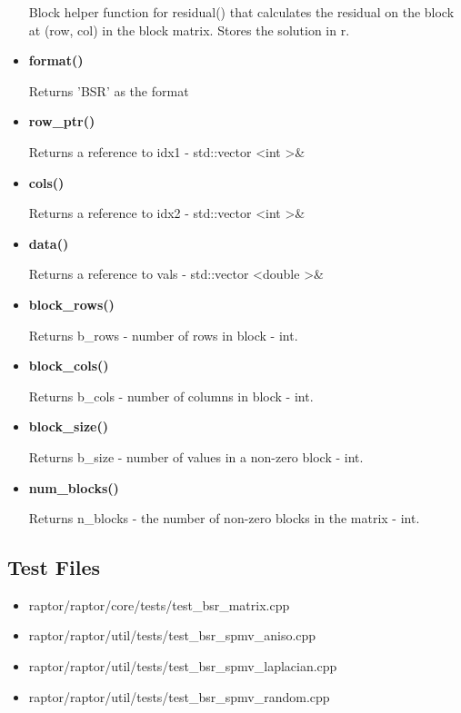 \documentclass{article}
\begin{document}
\begin{itemize}
            Block helper function for residual() that calculates the residual on the 
            block at (row, col) in the block matrix. Stores the solution in r.
                
        \item \textbf{format()}
        
            Returns 'BSR' as the format
        
        \item \textbf{row\_ptr()}
        
            Returns a reference to idx1 - std::vector \textless int \textgreater\&
        
        \item \textbf{cols()}
        
            Returns a reference to idx2 - std::vector \textless int \textgreater\&
        
        \item \textbf{data()}
        
            Returns a reference to vals - std::vector \textless double \textgreater\&
        
        \item \textbf{block\_rows()}
            
            Returns b\_rows - number of rows in block - int.
        
        \item \textbf{block\_cols()}
        
            Returns b\_cols - number of columns in block - int.
        
        \item \textbf{block\_size()}
        
            Returns b\_size - number of values in a non-zero block - int.
        
        \item \textbf{num\_blocks()}
        
            Returns n\_blocks - the number of non-zero blocks in the matrix - int.
    \end{itemize}

\subsection*{Test Files}
\begin{itemize}
    \item raptor/raptor/core/tests/test\_bsr\_matrix.cpp
    \item raptor/raptor/util/tests/test\_bsr\_spmv\_aniso.cpp
    \item raptor/raptor/util/tests/test\_bsr\_spmv\_laplacian.cpp
    \item raptor/raptor/util/tests/test\_bsr\_spmv\_random.cpp
\end{itemize}
\end{document}
